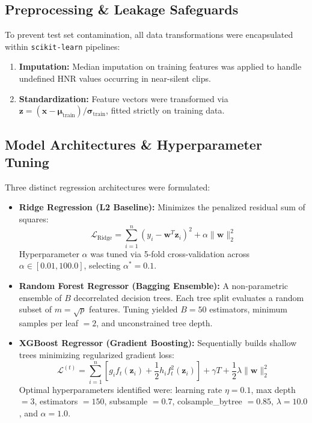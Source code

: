 \documentclass[conference]{IEEEtran}
\begin{document}
\subsection{Preprocessing \& Leakage Safeguards}
To prevent test set contamination, all data transformations were encapsulated within \texttt{scikit-learn} pipelines:
\begin{enumerate}
    \item \textbf{Imputation:} Median imputation on training features was applied to handle undefined HNR values occurring in near-silent clips.
    \item \textbf{Standardization:} Feature vectors were transformed via $\mathbf{z} = (\mathbf{x} - \boldsymbol{\mu}_{\text{train}}) / \boldsymbol{\sigma}_{\text{train}}$, fitted strictly on training data.
\end{enumerate}

\subsection{Model Architectures \& Hyperparameter Tuning}
Three distinct regression architectures were formulated:
\begin{itemize}
    \item \textbf{Ridge Regression (L2 Baseline):} Minimizes the penalized residual sum of squares:
    \begin{equation}
    \mathcal{L}_{\text{Ridge}} = \sum_{i=1}^{n} (y_i - \mathbf{w}^T \mathbf{z}_i)^2 + \alpha \|\mathbf{w}\|_2^2
    \end{equation}
    Hyperparameter $\alpha$ was tuned via 5-fold cross-validation across $\alpha \in [0.01, 100.0]$, selecting $\alpha^* = 0.1$.
    \item \textbf{Random Forest Regressor (Bagging Ensemble):} A non-parametric ensemble of $B$ decorrelated decision trees. Each tree split evaluates a random subset of $m = \sqrt{p}$ features. Tuning yielded $B = 50$ estimators, minimum samples per leaf $= 2$, and unconstrained tree depth.
    \item \textbf{XGBoost Regressor (Gradient Boosting):} Sequentially builds shallow trees minimizing regularized gradient loss:
    \begin{equation}
    \mathcal{L}^{(t)} = \sum_{i=1}^n \left[ g_i f_t(\mathbf{z}_i) + \frac{1}{2} h_i f_t^2(\mathbf{z}_i) \right] + \gamma T + \frac{1}{2} \lambda \|\mathbf{w}\|_2^2
    \end{equation}
    Optimal hyperparameters identified were: learning rate $\eta = 0.1$, max depth $= 3$, estimators $= 150$, subsample $= 0.7$, colsample\_bytree $= 0.85$, $\lambda = 10.0$, and $\alpha = 1.0$.
\end{itemize}
\end{document}
